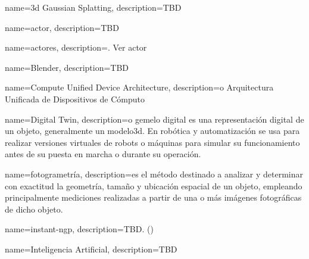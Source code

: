 


{
    name={\acrshort{3d} Gaussian Splatting},
    description={TBD}
}


{
    name={actor},
    description={TBD}
}

{
    name={actores},
    description={. Ver \gls{actor}}
}


{
    name={Blender},
    description={TBD}
}


{
    name={Compute Unified Device Architecture},
    description={o Arquitectura Unificada de Dispositivos de Cómputo}
}


{
    name={Digital Twin},
    description={o gemelo digital es una representación digital de un objeto, generalmente un \gls{modelo3d}. En robótica y automatización se usa para realizar versiones virtuales de robots o máquinas para simular su funcionamiento antes de su puesta en marcha o durante su operación.}
}



{
    name={fotogrametría},
    description={es el método destinado a analizar y determinar con exactitud la geometría, tamaño y ubicación espacial de un objeto, empleando principalmente mediciones realizadas a partir de una o más imágenes fotográficas de dicho objeto.}
}




{
    name={instant-ngp},
    description={TBD. (\cite{mueller2022instant})}
}

{
    name={Inteligencia Artificial},
    description={TBD}
}

